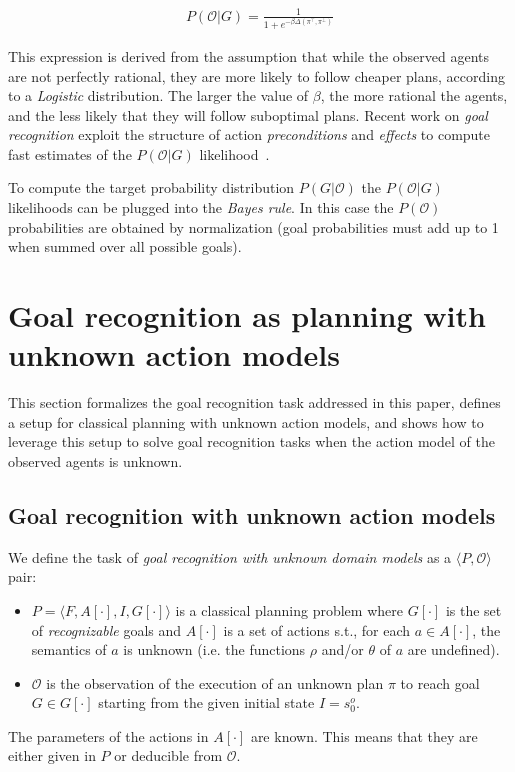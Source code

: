 \documentclass[letterpaper]{article} %
\newcommand{\tup}[1]{{\langle #1 \rangle}}
\begin{document}
\begin{align}
P(\mathcal{O}|G) = \frac{1}{1+e^{-\beta \Delta(\pi^\top,\pi^\bot)}}
\end{align}

This expression is derived from the assumption that while the observed agents are not perfectly rational, they are more likely to follow cheaper plans, according to a {\em Logistic} distribution. The larger the value of $\beta$, the more rational the agents, and the less likely that they will follow suboptimal plans. Recent work on {\em goal recognition} exploit the structure of action {\em preconditions} and {\em effects} to compute fast estimates of the $P(\mathcal{O}|G)$ likelihood~\cite{pereira2017landmark}.

To compute the target probability distribution $P(G|\mathcal{O})$ the $P(\mathcal{O}|G)$ likelihoods can be plugged into the {\em Bayes rule}. In this case the $P(\mathcal{O})$ probabilities are obtained by normalization (goal probabilities must add up to 1 when summed over all possible goals).



\section{Goal recognition as planning with unknown action models}
\label{sec:recognition}
This section formalizes the goal recognition task addressed in this paper, defines a setup for classical planning with unknown action models, and shows how to leverage this setup to solve goal recognition tasks when the action model of the observed agents is unknown.

\subsection{Goal recognition with unknown action models}
We define the task of {\em goal recognition with unknown domain models} as a $\tup{P,\mathcal{O}}$ pair:
\begin{itemize}
\item $P=\tup{F,A[\cdot],I,G[\cdot]}$ is a classical planning problem where $G[\cdot]$ is the set of {\em recognizable} goals and $A[\cdot]$ is a set of actions s.t., for each $a\in A[\cdot]$, the semantics of $a$ is unknown (i.e. the functions $\rho$ and/or $\theta$ of $a$ are undefined).
\item $\mathcal{O}$ is the observation of the execution of an unknown plan $\pi$ to reach goal $G\in G[\cdot]$ starting from the given initial state $I=s_0^o$.
\end{itemize}
The parameters of the actions in $A[\cdot]$ are known. This means that they are either given in $P$ or deducible from $\mathcal{O}$. 
\end{document}
